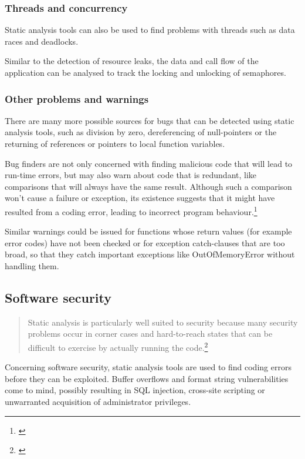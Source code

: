 \subsubsection{Threads and concurrency}

Static analysis tools can also be used to find problems with threads such as data races and deadlocks.

Similar to the detection of resource leaks, the data and call flow of the application can be analysed to track the locking and unlocking of semaphores.

\subsubsection{Other problems and warnings}

There are many more possible sources for bugs that can be detected using static analysis tools, such as division by zero, dereferencing of null-pointers or the returning of references or pointers to local function variables.

Bug finders are not only concerned with finding malicious code that will lead to run-time errors, but may also warn about code that is redundant, like comparisons that will always have the same result. Although such a comparison won't cause a failure or exception, its existence suggests that it might have resulted from a coding error, leading to incorrect program behaviour.\footnote{\citep[1]{UsingSAToFindBugs}}

Similar warnings could be issued for functions whose return values (for example error codes) have not been checked or for exception catch-clauses that are too broad, so that they catch important exceptions like OutOfMemoryError without handling them.

\subsection{Software security}

\begin{quotation}
Static analysis is particularly well suited to security because many security problems occur in corner cases and hard-to-reach states that can be difficult to exercise by actually running the code.\footnote{\citep[4]{SecureProgramming}}
\end{quotation}

Concerning software security, static analysis tools are used to find coding errors before they can be exploited. Buffer overflows and format string vulnerabilities come to mind, possibly resulting in SQL injection, cross-site scripting or unwarranted acquisition of administrator privileges. 

